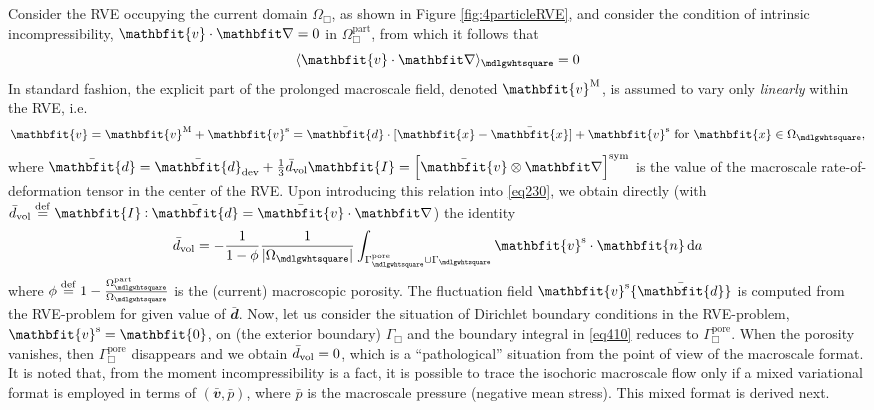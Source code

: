 \documentclass[12pt,a4paper,fleqn]{article}
\renewcommand{\ta}[1]{\mathbfit{#1}}
\renewcommand{\ts}[1]{\mathbfit{#1}}
\renewcommand{\Box}{\mdlgwhtsquare}
\newcommand{\pore}{\mathrm{pore}}
\newcommand{\particle}{\mathrm{part}}
\begin{document}
Consider the RVE occupying the current domain $\Omega_\Box$, as shown in Figure \ref{fig:4particleRVE}, and consider the condition of intrinsic incompressibility, $\ta{v}\cdot\diff=0$ in $\Omega_\Box^\particle$, from which it follows that
\begin{equation}
    \langle \ta{v}\cdot\diff \rangle_\Box  = 0
\label{eq230}
\end{equation}
In standard fashion, the explicit part of the prolonged macroscale field, denoted $\ta{v}^\macro$, is assumed to vary only \emph{linearly} within the RVE, i.e.
\begin{equation}
    \ta{v} = \ta{v}^\macro + \ta{v}^\fluct =
    \bar{\ts d} \cdot [\ta{x}-\bar{\ta{x}}] + \ta{v}^\fluct \mbox{ for }\ta{x}\in\Omega_\Box,
    \label{eq409}
\end{equation}
where $\bar{\ts d}=\bar{\ts d}_\dev+\frac{1}{3}\bar{d}_\vol\ts{I}=\left[\bar{\ta v}\outerp\diff\right]^\sym$ is the value of the macroscale rate-of-deformation tensor in the center of the RVE. Upon introducing this relation into \eqref{eq230}, we obtain directly (with $\bar{d}_\vol\defeq\ts{I}\dprod\bar{\ts d}=\bar{\ta v}\cdot\diff$) the identity
\begin{equation}
    \bar{d}_\vol = - \frac{1}{1-\phi}\frac{1}{|\Omega_\Box|}\int_{\Gamma_\Box^\pore\cup\Gamma_\Box} \ta{v}^\fluct\cdot\ta{n} \dif a
    \label{eq410}
\end{equation}
where $\phi\defeq 1-\frac{\Omega_\Box^\particle}{\Omega_\Box}$ is the (current) macroscopic porosity. The fluctuation field $\ta{v}^\fluct\{\bar{\ts d}\}$ is computed from the RVE-problem for given value of $\bar{\ts d}$. Now, let us consider the situation of Dirichlet boundary conditions in the RVE-problem, $\ta{v}^\fluct=\ta{0}$, on (the exterior boundary) $\Gamma_\Box$ and the boundary integral in \eqref{eq410} reduces to $\Gamma_\Box^\pore$. When the porosity vanishes, then $\Gamma_\Box^\pore$ disappears and we obtain $\bar{d}_{\mathrm{vol}} = 0$, which is a ``pathological'' situation from the point of view of the macroscale format. It is noted that, from the moment incompressibility is a fact, it is possible to trace the isochoric macroscale flow only if a mixed variational format is employed in terms of $(\bar{\ta v},\bar{p})$, where $\bar{p}$ is the macroscale pressure (negative mean stress). This mixed format is derived next.
\end{document}
